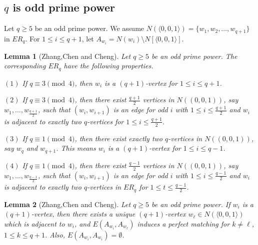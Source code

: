 \documentclass[12pt]{article}
\newtheorem{lemma}{Lemma}
\begin{document}
	\subsection{$q$ is odd prime power}
	Let \(q \geq 5\) be an odd prime power. We assume \(N(\langle 0,0,1\rangle) = \{w_1, w_2, \dots, w_{q+1}\}\) in \(ER_q\). For \(1 \leq i \leq q + 1\), let \(A_{w_i} = N(w_i) \setminus N[\langle 0,0,1\rangle]\).
%	
%		
%
	\begin{lemma}[Zhang,Chen and Cheng]
		Let \(q \geq 5\) be an odd prime power. The corresponding \(ER_q\) have the following properties.
		
			$(1)$ If \(q \equiv 3 \pmod{4}\), then \(w_i\) is a \((q + 1)\)-vertex for \(1 \leq i \leq q + 1\).
			
			$(2)$ If \(q \equiv 3 \pmod{4}\), then there exist \(\frac{q+1}{2}\) vertices in \(N((0,0,1))\), say \(w_1,\dots,w_{\frac{q+1}{2}}\), such that \((w_i, w_{i+1})\) is an edge for odd \(i\) with \(1 \leq i \leq \frac{q + 1}{2}\) and \(w_i\) is adjacent to exactly two \(q\)-vertices for \(1 \leq i \leq \frac{q + 1}{2}\).
			
			$(3)$ If \(q \equiv 1 \pmod{4}\), then there exist exactly two \(q\)-vertices in \(N((0,0,1))\), say \(w_q\) and \(w_{q+1}\). This means \(w_i\) is a \((q + 1)\)-vertex for \(1 \leq i \leq q - 1\).
			
			$(4)$ If \(q \equiv 1 \pmod{4}\), then there exist \(\frac{q-1}{2}\) vertices in \(N((0,0,1))\), say \(w_1,\dots,w_{\frac{q-1}{2}}\), such that \((w_i, w_{i+1})\) is an edge for odd \(i\) with \(1 \leq i \leq \frac{q - 1}{2}\) and \(w_i\) is adjacent to exactly two \(q\)-vertices in \(ER_q\) for \(1 \leq t \leq \frac{q - 1}{2}\).
	\end{lemma}
	
	\begin{lemma}[Zhang,Chen and Cheng]
		Let \(q \geq 5\) be an odd prime power. If \(w_i\) is a \((q+1)\)-vertex, then there exists a unique \((q+1)\)-vertex \(w_{\ell} \in N(\langle 0,0,1\rangle)\) which is adjacent to \(w_i\), and \(E(A_{w_i}, A_{w_{\ell}})\) induces a perfect matching for \(k \neq \ell\), \(1 \leq k \leq q + 1\). Also, \(E(A_{w_i}, A_{w_i}) = \emptyset\).
	\end{lemma}
\end{document}
